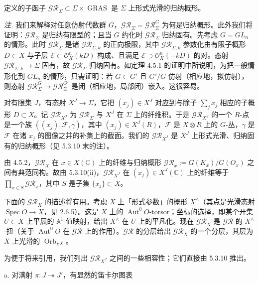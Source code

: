 定义的子函子 $\mathcal{GR}_\Sigma\subset\Sigma\times\operatorname{GRAS}$ 是 $\Sigma$ 上形式光滑的归纳概形。

\emph{注.} 我们来解释对任意仿射代数群 $G$，$\mathcal{GR}_\Sigma=\mathcal{GR}^{G}_\Sigma$ 为何是归纳概形。此外我们将证明：$\mathcal{GR}_\Sigma$ 是归纳有限型的；且当 $G$ 约化时 $\mathcal{GR}_\Sigma$ 归纳固有。先考虑 $G=GL_n$ 的情形。此时 $\mathcal{GR}_\Sigma$ 是诸 $\mathcal{GR}_{\Sigma,k}$ 的正向极限，其中 $\mathcal{GR}_{\Sigma,k}$ 参数化由有限子概形 $D\subset X$ 与子层 $\mathcal{E}\subset\mathcal{O}_X^{n}(kD)$ 构成、且满足 $\mathcal{E}\supset\mathcal{O}_X^{n}(-kD)$ 的对。态射 $\mathcal{GR}_{\Sigma,k}\to\Sigma$ 固有，故 $\mathcal{GR}_\Sigma$ 归纳固有。如定理 4.5.1 的证明中所说明，为把一般情形化到 $GL_n$ 的情形，只需证明：若 $G\subset G'$ 且 $G'/G$ 仿射（相应地，拟仿射），则态射 $\mathcal{GR}^{G}_\Sigma\to\mathcal{GR}^{G'}_\Sigma$ 是闭（相应地，局部闭）嵌入。这很容易。

 对有限集 $J$，有态射 $X^{J}\to\Sigma$，它把 $(x_j)\in X^{J}$ 对应到与除子 $\sum_j x_j$ 相应的子概形 $D\subset X$。记 $\mathcal{GR}_{X^{J}}$ 为 $\mathcal{GR}_\Sigma$ 与 $X^{J}$ 在 $\Sigma$ 上的纤维积。于是 $\mathcal{GR}_{X^{J}}$ 的一个 $R$-点是一个族 $((x_j),\mathcal{F},\gamma)$，其中 $(x_j)\in X^{J}(R)$，$\mathcal{F}$ 是 $X\otimes R$ 上的 $G$-丛，$\gamma$ 是 $\mathcal{F}$ 在诸 $x_j$ 的图像之并的补集上的截面。我们的 $\mathcal{GR}_{X^{J}}$ 是 $X^{J}$ 上形式光滑、归纳固有的归纳概形（见 5.3.10 末的注）。

由 4.5.2，$\mathcal{GR}_X$ 在 $x\in X(\mathbb{C})$ 上的纤维与归纳概形 $\mathcal{GR}_x:=G(K_x)/G(O_x)$ 之间有典范同构。故由 5.3.10(ii)，$\mathcal{GR}_{X^{J}}$ 在 $(x_j)\in X^{J}(\mathbb{C})$ 上的纤维等于 $\prod_{x\in S}\mathcal{GR}_x$，其中 $S$ 是子集 $\{x_j\}\subset X$。

下面的 $\mathcal{GR}_X$ 的描述将有用。考虑 $X$ 上「形式参数」的概形 $X^{\wedge}$（其点是光滑态射 $\operatorname{Spec}O\to X$，见 2.6.5）。这是 $X$ 上的 $\operatorname{Aut}^{0}O$-torsor；坐标的选择，即某个开集 $U\subset X$ 上平展的 $\mathbb{A}^{1}$-值映射，给出 $X^{\wedge}$ 在 $U$ 上的平凡化。现在 $\mathcal{GR}_X$ 是 $\mathcal{GR}$ 的 $X^{\wedge}$-扭（关于 $\operatorname{Aut}^{0}O$ 在 $\mathcal{GR}$ 上的作用）。$\mathcal{GR}$ 的分层给出 $\mathcal{GR}_X$ 的一个分层，其层为 $X$ 上光滑的 $\operatorname{Orb}_{\chi X}$。

 为便于将来引用，我们列出 $\mathcal{GR}_{X^{J}}$ 之间的一些相容性；它们直接由 5.3.10 推出。

a. 对满射 $\pi:J\twoheadrightarrow J'$，有显然的笛卡尔图表

